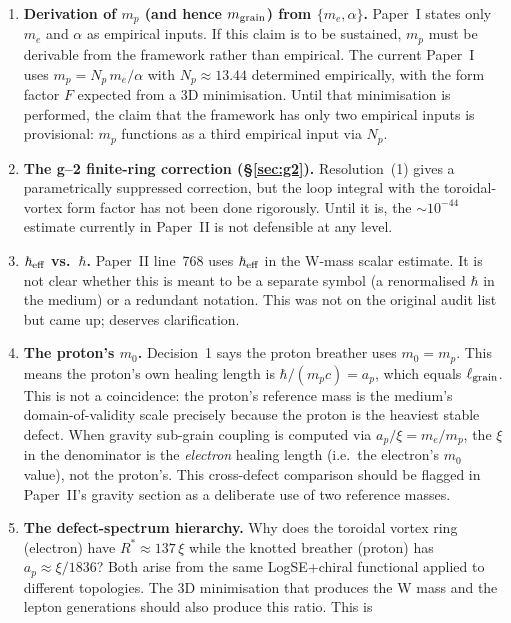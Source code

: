 \documentclass[11pt,a4paper]{article}
\begin{document}
\begin{enumerate}
\item \textbf{Derivation of $m_p$ (and hence $m_{\rm grain}$) from
      $\{m_e, \alpha\}$.}  Paper~I states only $m_e$ and $\alpha$ as
      empirical inputs.  If this claim is to be sustained, $m_p$ must be
      derivable from the framework rather than empirical.  The current
      Paper~I uses $m_p = N_p\,m_e/\alpha$ with $N_p \approx 13.44$
      determined empirically, with the form factor $F$ expected from a
      3D minimisation.  Until that minimisation is performed, the claim
      that the framework has only two empirical inputs is provisional:
      $m_p$ functions as a third empirical input via $N_p$.
\item \textbf{The g--2 finite-ring correction (\S\ref{sec:g2}).}
      Resolution~(1) gives a parametrically suppressed correction,
      but the loop integral with the toroidal-vortex form factor has
      not been done rigorously.  Until it is, the $\sim 10^{-44}$
      estimate currently in Paper~II is not defensible at any level.
\item \textbf{$\hbar_{\rm eff}$ vs.\ $\hbar$.}  Paper~II line~768 uses
      $\hbar_{\rm eff}$ in the W-mass scalar estimate.  It is not clear
      whether this is meant to be a separate symbol (a renormalised
      $\hbar$ in the medium) or a redundant notation.  This was not on
      the original audit list but came up; deserves clarification.
\item \textbf{The proton's $m_0$.}  Decision~1 says the proton breather
      uses $m_0 = m_p$.  This means the proton's own healing length is
      $\hbar/(m_p c) = a_p$, which equals $\ell_{\rm grain}$.  This is
      not a coincidence: the proton's reference mass is the medium's
      domain-of-validity scale precisely because the proton is the
      heaviest stable defect.  When gravity sub-grain coupling is
      computed via $a_p/\xi = m_e/m_p$, the $\xi$ in the denominator is
      the \emph{electron} healing length (i.e.\ the electron's $m_0$
      value), not the proton's.  This cross-defect comparison should be
      flagged in Paper~II's gravity section as a deliberate use of two
      reference masses.
\item \textbf{The defect-spectrum hierarchy.}  Why does the toroidal
      vortex ring (electron) have $R^* \approx 137\,\xi$ while the
      knotted breather (proton) has $a_p \approx \xi/1836$?  Both
      arise from the same LogSE+chiral functional applied to different
      topologies.  The 3D minimisation that produces the W mass and
      the lepton generations should also produce this ratio.  This is

\end{enumerate}
\end{document}
